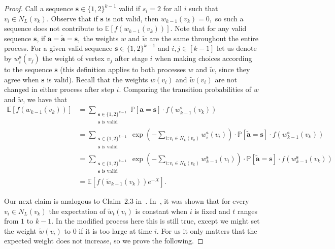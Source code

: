 \documentclass[10pt]{amsart}
\newenvironment{claimproof}[1][\proofname]{\proof[#1]\renewcommand{\qedsymbol}{$\blacksquare$}}{\endproof}
\theoremstyle{definition}
\newcommand{\mbE}{\mathbb{E}}
\renewcommand{\Pr}{\mathbb{P}}
\begin{document}
\begin{proof}
\begin{claimproof}
    Call a sequence $\mathbf{s} \in \{1,2\}^{k-1}$ valid if $s_i = 2$ for all $i$ such that $v_i \in N_L(v_k).$ Observe that if $\mathbf{s}$ is not valid, then $w_{k-1}(v_k) = 0,$ so such a sequence does not contribute to $\mbE[f(w_{k-1}(v_k))].$ Note that for any valid sequence $\mathbf{s}$, if $\mathbf{a} = \tilde{\mathbf{a}}=\mathbf{s},$ the weights $w$ and $\tilde{w}$ are the same throughout the entire process.     For a given valid sequence $\mathbf{s} \in \{1, 2\}^{k-1}$ and $i,j \in [k-1]$ let us denote by $w^{\mathbf{s}}_i(v_j)$ the weight of vertex $v_j$ after stage $i$ when making choices according to the sequence $\mathbf{s}$ (this definition applies to both processes $w$ and $\tilde{w}$, since they agree when $\mathbf{s}$ is valid). Recall that the weights $w(v_i)$ and $\tilde{w}(v_i)$ are not changed in either process after step $i.$ Comparing the transition probabilities of $w$ and $\tilde{w}$, we have that 
    \begin{align*} \mbE[f(w_{k-1}(v_k))] &= \sum_{\substack{\mathbf{s} \in \{1,2\}^{k-1}\\ \mathbf{s} \text{ is valid}}} \Pr[\mathbf{a}=\mathbf{s}] \cdot f(w_{k-1}^{\mathbf{s}}(v_k)) \\ &= \sum_{\substack{\mathbf{s} \in \{1,2\}^{k-1}\\ \mathbf{s} \text{ is valid}}} \exp\left(- \sum_{i : v_i \in N_L(v_k)} w_{i}^{\mathbf{s}}(v_i) \right) \cdot \Pr[\tilde{\mathbf{a}}= \mathbf{s}] \cdot f(w_{k-1}^{\mathbf{s}}(v_k))\\
    &=\sum_{\substack{\mathbf{s} \in \{1,2\}^{k-1}\\ \mathbf{s} \text{ is valid}}} \exp\left(- \sum_{i : v_i \in N_L(v_k)} w_{k-1}^{\mathbf{s}}(v_i) \right) \cdot \Pr[\tilde{\mathbf{a}}= \mathbf{s}] \cdot f(w_{k-1}^{\mathbf{s}}(v_k))\\ &=  \mathbb{E}[f(\tilde{w}_{k-1}(v_k))e^{-X}].
    \end{align*}
\end{claimproof}

Our next claim is analogous to Claim~2.3 in~\cite{martinsson}. In~\cite{martinsson}, it was shown that for every $v_i\in N_L(v_k)$ the expectation of $\tilde{w}_t(v_i)$ is constant when $i$ is fixed and $t$ ranges from $1$ to $k-1$. In the modified process here this is still true, except we might set the weight $\tilde{w}(v_i)$ to $0$ if it is too large at time $i$. For us it only matters that the expected weight does not increase, so we prove the following.


\end{proof}
\end{document}
